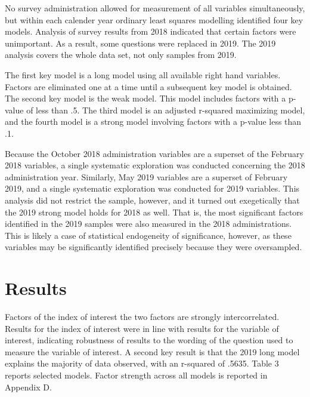 \documentclass[AER]{./aea-latex-templates/AEA}
\begin{document}
No survey administration allowed for measurement of all variables simultaneously,
but within each calender year ordinary least squares modelling identified four key models.
Analysis of survey results from 2018 indicated that certain factors were unimportant.
As a result, some questions were replaced in 2019. The 2019 analysis covers the whole data
set, not only samples from 2019.

The first key model is a long model using all available right hand variables.
Factors are eliminated one at a time until a subsequent key model is obtained.
The second key model is the weak model. This model includes factors with a p-value of less than .5.
The third model is an adjusted r-squared maximizing model, and the fourth
model is a strong model involving factors with a p-value less than .1.

Because the October 2018 administration variables are a superset of the
February 2018 variables, a single systematic exploration was conducted
concerning the 2018 administration year. Similarly, May 2019 variables are
a superset of February 2019, and a single systematic exploration was
conducted for 2019 variables. This analysis did not restrict the sample,
however, and it turned out exegetically that the 2019 strong model holds
for 2018 as well. That is, the most significant factors identified in the
2019 samples were also measured in the 2018 administrations. This is
likely a case of statistical endogeneity of significance, however, as
these variables may be significantly identified precisely because they
were oversampled.

\section{Results}

Factors of the index of interest the two factors
are strongly intercorrelated. Results for the index of interest were in line
with results for the variable of interest, indicating robustness of results
to the wording of the question used to measure the variable of interest.
A second key result is that the 2019 long model explains the majority of data observed, with an r-squared of .5635.
Table 3 reports selected models. Factor strength across all models is reported in Appendix D.
\end{document}
